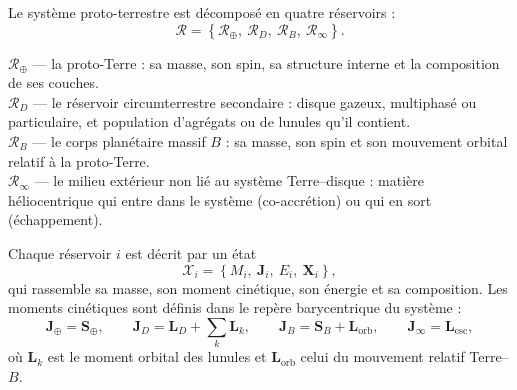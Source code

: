 \documentclass[11pt,a4paper,openany]{report}
\newcommand{\RT}{\mathcal{R}_{\oplus}}
\newcommand{\RD}{\mathcal{R}_{D}}
\newcommand{\RB}{\mathcal{R}_{B}}
\newcommand{\Rinf}{\mathcal{R}_{\infty}}
\begin{document}
Le système proto-terrestre est décomposé en quatre réservoirs :
\begin{equation}
\mathcal{R}=\left\{\RT,\ \RD,\ \RB,\ \Rinf\right\}.
\label{eq:reservoirs}
\end{equation}

\begin{definition}
\textbf{$\RT$} --- la proto-Terre : sa masse, son spin, sa structure interne et la composition de ses
couches.\\
\textbf{$\RD$} --- le réservoir circumterrestre secondaire : disque gazeux, multiphasé ou particulaire,
et population d'agrégats ou de lunules qu'il contient.\\
\textbf{$\RB$} --- le corps planétaire massif $B$ : sa masse, son spin et son mouvement orbital
relatif à la proto-Terre.\\
\textbf{$\Rinf$} --- le milieu extérieur non lié au système Terre--disque : matière héliocentrique
qui entre dans le système (co-accrétion) ou qui en sort (échappement).
\end{definition}

Chaque réservoir $i$ est décrit par un état
\begin{equation}
\mathcal{X}_i=\left\{M_i,\ \mathbf{J}_i,\ E_i,\ \mathbf{X}_i\right\},
\label{eq:etat-reservoir}
\end{equation}
qui rassemble sa masse, son moment cinétique, son énergie et sa composition. Les moments
cinétiques sont définis dans le repère barycentrique du système :
\begin{equation}
\mathbf{J}_\oplus=\mathbf{S}_\oplus,\qquad
\mathbf{J}_D=\mathbf{L}_D+\sum_k\mathbf{L}_k,\qquad
\mathbf{J}_B=\mathbf{S}_B+\mathbf{L}_{\mathrm{orb}},\qquad
\mathbf{J}_\infty=\mathbf{L}_{\mathrm{esc}},
\label{eq:J-reservoirs}
\end{equation}
où $\mathbf{L}_k$ est le moment orbital des lunules et $\mathbf{L}_{\mathrm{orb}}$ celui du
mouvement relatif Terre--$B$.
\end{document}
